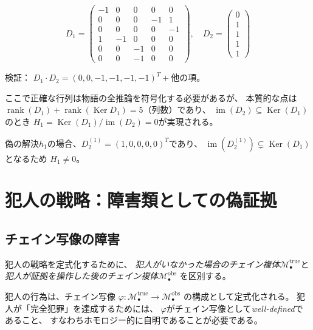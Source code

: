 \documentclass[12pt,twocolumn]{ltjsarticle}
\newcommand{\im}{\operatorname{im}}
\newcommand{\Ker}{\operatorname{Ker}}
\renewcommand{\rank}{\operatorname{rank}}
\newcommand{\Mys}{\mathcal{M}}
\begin{document}
\begin{equation}
D_1 = \begin{pmatrix}
-1 & 0 & 0 & 0 & 0 \\
 0 & 0 & 0 & -1 & 1 \\
 0 & 0 & 0 & 0 & -1 \\
 1 & -1 & 0 & 0 & 0 \\
 0 & 0 & -1 & 0 & 0 \\
 0 & 0 & -1 & 0 & 0
\end{pmatrix}
, \quad
D_2 = \begin{pmatrix}
0 \\ 1 \\ 1 \\ 1 \\ 1
\end{pmatrix}
\end{equation}

検証：
$D_1 \cdot D_2 = (0, 0, -1, -1, -1, -1)^T + \text{他の項}$。

ここで正確な行列は物語の全推論を符号化する必要があるが、
本質的な点は$\rank(D_1) + \rank(\Ker D_1) = 5$（列数）であり、
$\im(D_2) \subseteq \Ker(D_1)$のとき
$H_1 = \Ker(D_1)/\im(D_2) = 0$が実現される。

偽の解決$h_1$の場合、$D_2^{(1)} = (1, 0, 0, 0, 0)^T$であり、
$\im(D_2^{(1)}) \subsetneq \Ker(D_1)$となるため
$H_1 \neq 0$。


\section{犯人の戦略：障害類としての偽証拠}
\label{sec:obstruction}

\subsection{チェイン写像の障害}

犯人の戦略を定式化するために、
\emph{犯人がいなかった場合のチェイン複体}$\Mys^{\text{true}}_\bullet$と
\emph{犯人が証拠を操作した後のチェイン複体}$\Mys^{\text{obs}}_\bullet$
を区別する。

犯人の行為は、チェイン写像
$\varphi: \Mys^{\text{true}}_\bullet \to \Mys^{\text{obs}}_\bullet$
の構成として定式化される。
犯人が「完全犯罪」を達成するためには、
$\varphi$がチェイン写像として\emph{well-defined}であること、
すなわちホモロジー的に自明であることが必要である。
\end{document}
